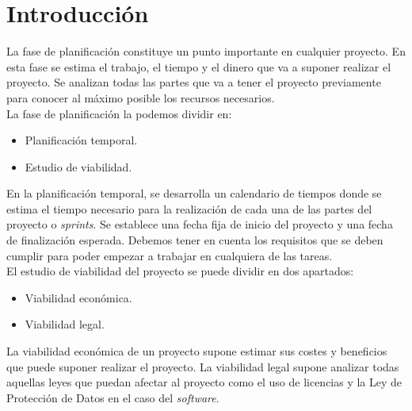 
\section{Introducción}
La fase de planificación constituye un punto importante en cualquier proyecto. En esta fase se estima el trabajo, el tiempo y el dinero que va a suponer realizar el proyecto. Se analizan todas las partes que va a tener el proyecto previamente para conocer al máximo posible los recursos necesarios. \\
La fase de planificación la podemos dividir en:
\begin{itemize}
    \item Planificación temporal.
    \item Estudio de viabilidad.
\end{itemize}
En la planificación temporal, se desarrolla un calendario de tiempos donde se estima el tiempo necesario para la realización de cada una de las partes del proyecto o \textit{sprints}. Se establece una fecha fija de inicio del proyecto y una fecha de finalización esperada. Debemos tener en cuenta los requisitos que se deben cumplir para poder empezar a trabajar en cualquiera de las tareas. \\
El estudio de viabilidad del proyecto se puede dividir en dos apartados:
\begin{itemize}
    \item Viabilidad económica.
    \item Viabilidad legal.
\end{itemize}
La viabilidad económica de un proyecto supone estimar sus costes y beneficios que puede suponer realizar el proyecto.
La viabilidad legal supone analizar todas aquellas leyes que puedan afectar al proyecto como el uso de licencias y la Ley de Protección de Datos en el caso del \textit{software}.

